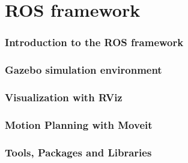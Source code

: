 \section{ROS framework}

\begin{frame}
\frametitle{Introduction to the ROS framework}
\end{frame}

\begin{frame}
\frametitle{Gazebo simulation environment}
\end{frame}

\begin{frame}
\frametitle{Visualization with RViz}
\end{frame}

\begin{frame}
\frametitle{Motion Planning with Moveit}
\end{frame}

\begin{frame}
\frametitle{Tools, Packages and Libraries}
\end{frame}